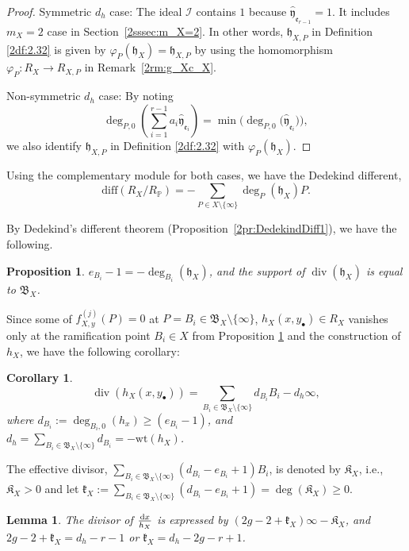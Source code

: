\documentclass[pdftex]{sigma}
\def\PP{{\mathbb P}}
\def\cI{{\mathcal I}}
\def\fB{{\mathfrak B}}
\def\fK{{\mathfrak K}}
\def\fe{{\mathfrak e}}
\def\fh{{\mathfrak h}}
\def\fk{{\mathfrak k}}
\def\hfy{{\widehat{\mathfrak y}}}
\def\diff{\mathrm{diff}}
\def\Div{\operatorname{div}}
\def\wt{{\mathrm {wt}}}
\numberwithin{equation}{section}
\newtheorem{Corollary}[Theorem]{Corollary}
\newtheorem{Lemma}[Theorem]{Lemma}
\newtheorem{Proposition}[Theorem]{Proposition}
 { \theoremstyle{definition}
\newtheorem{Definition}[Theorem]{Definition}
\newtheorem{Note}[Theorem]{Note}
\newtheorem{Example}[Theorem]{Example}
\newtheorem{Remark}[Theorem]{Remark} }
\begin{document}
\begin{proof}
Symmetric $d_h$ case: The ideal $\cI$ contains $1$ because $\hfy_{\fe_{r-1}}=1$.
It includes $m_X=2$ case in Section~\ref{2sssec:m_X=2}.
In other words, $\fh_{X,P}$ in Definition \ref{2df:2.32} is given by $\varphi_P(\fh_X)=\fh_{X,P}$ by using the homomorphism $\varphi_P\colon R_X \to R_{X,P}$ in Remark~\ref{2rm:g_Xc_X}.

Non-symmetric $d_h$ case:
By noting
\[
\deg_{P,0}\left(\sum_{i=1}^{r-1}a_i \hfy_{\fe_i}\right)=
\min\big(\deg_{P,0}\big( \hfy_{\fe_i}\big)\big),
\]
we also identify $\fh_{X,P}$ in Definition \ref{2df:2.32} with $\varphi_P(\fh_X)$.
\end{proof}

Using the complementary module for both cases, we have the Dedekind different,
\[
\diff(R_X/R_\PP)=-
\sum_{P\in X\setminus\{\infty\}}
\deg_P(\fh_{X}) P.
\]

By Dedekind's different theorem (Proposition~\ref{2pr:DedekindDiff1}), we have the following.
\begin{Proposition}\label{2pr:DedekindDiff30}
$e_{B_i}-1=-\deg_{B_i}(\fh_X)$, and the support of $\Div(\fh_X)$ is equal to $\fB_X$.
\end{Proposition}

Since some of $f_{X,y}^{(j)}(P)=0$ at $P=B_i \in \fB_X\setminus\{\infty\}$, $h_X(x, y_\bullet)\in R_X$ vanishes only at the ramification point $B_i\in X$ from Proposition \ref{2pr:DedekindDiff30} and the construction of $h_X$, we have the following corollary:

\begin{Corollary}\label{2cr:h_X}
\[
\Div(h_X(x,y_\bullet)) =
\sum_{B_i\in \fB_X\setminus\{\infty\}}d_{B_
i} B_i
-d_h\infty,
\]
where $d_{B_i}:=\deg_{B_i,0}(h_x) \ge (e_{B_i}-1)$, and $d_h = \sum_{B_i\in \fB_X\setminus\{\infty\}}d_{B_i}=-\wt (h_X)$.
\end{Corollary}

\begin{Definition}\label{2df:fKX_fkX}
The effective divisor, $\sum_{B_i\in \fB_X\setminus\{\infty\}}(d_{B_i}-e_{B_i}+1)B_i$, is denoted by
$\fK_X$, i.e., $\fK_X>0$ and let
$\fk_X:=\sum_{B_i\in \fB_X\setminus\{\infty\}}(d_{B_i}-e_{B_i}+1)=\deg(\fK_X)\ge0$.
\end{Definition}

\begin{Lemma}\label{2lm:dx_hX}
The divisor of $\frac{{\rm d} x}{h_X}$ is expressed by $(2g-2+\fk_X)\infty-\fK_X$, and $2g-2+\fk_X=d_h - r- 1$ or $\fk_X=d_h - 2g- r+1$.
\end{Lemma}
\end{document}
